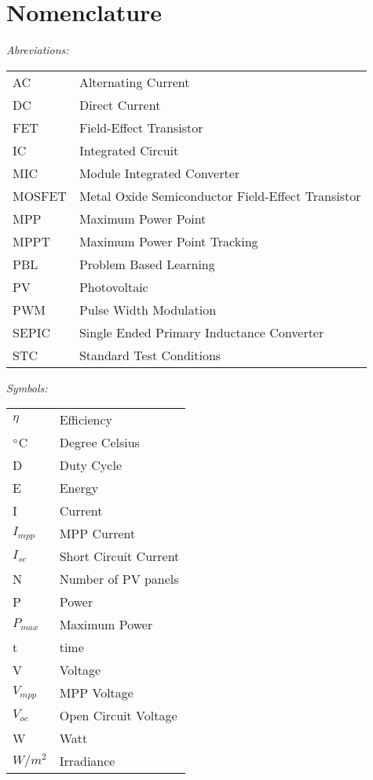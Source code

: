 \chapter*{Nomenclature}

\textit{Abreviations:}\newline
\begin{tabular}{ll} %
AC & Alternating Current\\
DC & Direct Current\\
FET & Field-Effect Transistor\\
IC & Integrated Circuit\\
MIC & Module Integrated Converter\\
MOSFET & Metal Oxide Semiconductor Field-Effect Transistor\\
MPP & Maximum Power Point\\
MPPT & Maximum Power Point Tracking\\
PBL & Problem Based Learning\\
PV & Photovoltaic\\
PWM & Pulse Width Modulation\\
SEPIC & Single Ended Primary Inductance Converter\\
STC & Standard Test Conditions\\
\end{tabular}

\vspace{10mm} %

\textit{Symbols:}\newline
\begin{tabular}{ll}
$\eta$ & Efficiency\\
$\dec$C & Degree Celsius\\
D & Duty Cycle\\
E & Energy\\
I & Current\\
$I_{mpp}$ & MPP Current\\
$I_{sc}$ & Short Circuit Current\\
N & Number of PV panels \\
P & Power\\
$P_{max}$ & Maximum Power\\
t & time\\
V & Voltage\\
$V_{mpp}$ & MPP Voltage\\
$V_{oc}$ & Open Circuit Voltage\\
W & Watt\\
$W/m^2$ & Irradiance\\
\end{tabular}